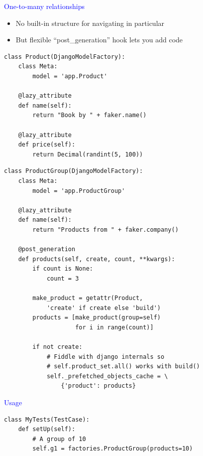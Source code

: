 \documentclass[landscape]{slides}
\begin{document}
\begin{slide}
    \textcolor{blue}{\Large{One-to-many relationships}}

    \begin{itemize}
        \item No built-in structure for navigating in particular
        \item But flexible ``post\_generation'' hook lets you add code
    \end{itemize}
\end{slide}


\begin{slide}
    \begin{lstlisting}
class Product(DjangoModelFactory):
    class Meta:
        model = 'app.Product'

    @lazy_attribute
    def name(self):
        return "Book by " + faker.name()

    @lazy_attribute
    def price(self):
        return Decimal(randint(5, 100))
    \end{lstlisting}

\end{slide}


\begin{slide}
    \begin{lstlisting}
class ProductGroup(DjangoModelFactory):
    class Meta:
        model = 'app.ProductGroup'

    @lazy_attribute
    def name(self):
        return "Products from " + faker.company()

    @post_generation
    def products(self, create, count, **kwargs):
        if count is None:
            count = 3

        make_product = getattr(Product,
            'create' if create else 'build')
        products = [make_product(group=self)
                    for i in range(count)]

        if not create:
            # Fiddle with django internals so
            # self.product_set.all() works with build()
            self._prefetched_objects_cache = \
                {'product': products}
    \end{lstlisting}
\end{slide}


\begin{slide}
    \textcolor{blue}{\Large{Usage}}

    \begin{lstlisting}
class MyTests(TestCase):
    def setUp(self):
        # A group of 10
        self.g1 = factories.ProductGroup(products=10)
    \end{lstlisting}
\end{slide}
\end{document}
